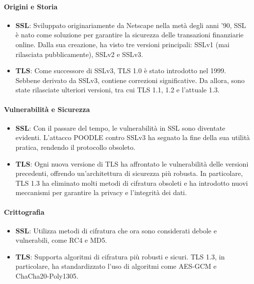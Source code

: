 \documentclass{article}
\theoremstyle{definition}
\begin{document}
\paragraph{Origini e Storia}

\begin{itemize}
    \item \textbf{SSL}: Sviluppato originariamente da Netscape nella metà degli anni '90, SSL è nato come soluzione per garantire la sicurezza delle transazioni finanziarie online. Dalla sua creazione, ha visto tre versioni principali: SSLv1 (mai rilasciata pubblicamente), SSLv2 e SSLv3.
    
    \item \textbf{TLS}: Come successore di SSLv3, TLS 1.0 è stato introdotto nel 1999. Sebbene derivato da SSLv3, contiene correzioni significative. Da allora, sono state rilasciate ulteriori versioni, tra cui TLS 1.1, 1.2 e l'attuale 1.3.
\end{itemize}

\paragraph{Vulnerabilità e Sicurezza}

\begin{itemize}
    \item \textbf{SSL}: Con il passare del tempo, le vulnerabilità in SSL sono diventate evidenti. L'attacco POODLE contro SSLv3 ha segnato la fine della sua utilità pratica, rendendo il protocollo obsoleto.
    
    \item \textbf{TLS}: Ogni nuova versione di TLS ha affrontato le vulnerabilità delle versioni precedenti, offrendo un'architettura di sicurezza più robusta. In particolare, TLS 1.3 ha eliminato molti metodi di cifratura obsoleti e ha introdotto nuovi meccanismi per garantire la privacy e l'integrità dei dati.
\end{itemize}

\paragraph{Crittografia}

\begin{itemize}
    \item \textbf{SSL}: Utilizza metodi di cifratura che ora sono considerati debole e vulnerabili, come RC4 e MD5.
    
    \item \textbf{TLS}: Supporta algoritmi di cifratura più robusti e sicuri. TLS 1.3, in particolare, ha standardizzato l'uso di algoritmi come AES-GCM e ChaCha20-Poly1305.
\end{itemize}
\end{document}
